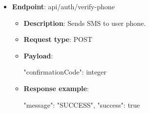 \begin{itemize}
\begin{itemize}
        \item \textbf{Payload}:

        \begin{spverbatim}
        {
            "email": "string",
            "password": "string"
        }
        \end{spverbatim}

        \item \textbf{Response example}:

        \begin{spverbatim}
        {
            "accessToken": "string",
            "refreshTokenId": "string",
            "message": "SUCCESS",
            "success": true
        }
        \end{spverbatim}

        \item \textbf{Response codes}: 200, 400

        \item \textbf{Response messages}:
        \begin{enumerate}
            \item Success.
            \item Invalid credentials.
        \end{enumerate}
    \end{itemize}

    \item \textbf{Endpoint}: api/auth/verify-phone
    \begin{itemize}

        \item \textbf{Description}: Sends SMS to user phone.

        \item \textbf{Request type}: POST

        \item \textbf{Payload}:

        \begin{spverbatim}
        {
            "confirmationCode": integer
        }
        \end{spverbatim}

        \item \textbf{Response example}:

        \begin{spverbatim}
        {
            "message": "SUCCESS",
            "success": true
        }
        \end{spverbatim}


\end{itemize}
\end{itemize}
